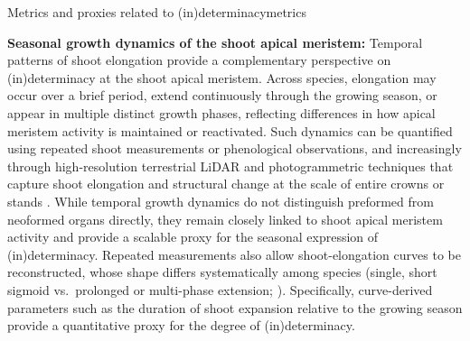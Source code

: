 \documentclass{article}
\begin{document}
\begin{metricsbox}{Metrics and proxies related to (in)determinacy}{metrics}
			
			 \textbf{Seasonal growth dynamics of the shoot apical meristem:} Temporal patterns of shoot elongation provide a complementary perspective on (in)determinacy at the shoot apical meristem. Across species, elongation may occur over a brief period, extend continuously through the growing season, or appear in multiple distinct growth phases, reflecting differences in how apical meristem activity is maintained or reactivated. Such dynamics can be quantified using repeated shoot measurements or phenological observations, and increasingly through high-resolution terrestrial LiDAR and photogrammetric techniques that capture shoot elongation and structural change at the scale of entire crowns or stands \citep{zhangForestsGrowthMonitoring2019, jinEstimationLarchGrowth2022}. While temporal growth dynamics do not distinguish preformed from neoformed organs directly, they remain closely linked to shoot apical meristem activity and provide a scalable proxy for the seasonal expression of (in)determinacy. Repeated measurements also allow shoot-elongation curves to be reconstructed, whose shape differs systematically among species (single, short sigmoid vs.\ prolonged or multi-phase extension; \citet{hoverGrowthPhenologyPinus2017,kusterPhenologicalTimetableOak2014}).
			  Specifically, curve-derived parameters such as the duration of shoot expansion relative to the growing season provide a quantitative proxy for the degree of (in)determinacy. \\
			 
		
			\end{metricsbox}
	
\end{document}
